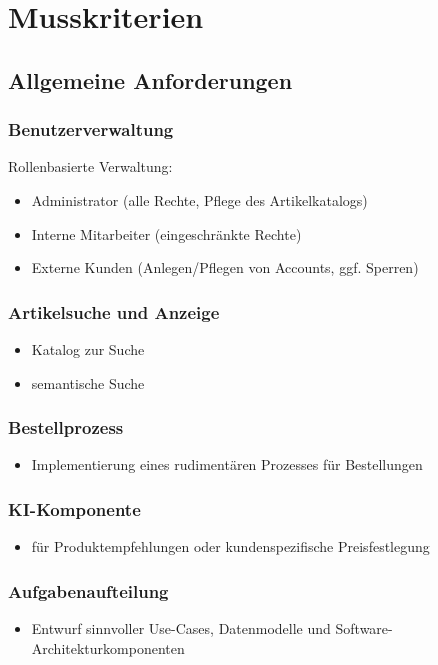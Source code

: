 \documentclass[%
	ngerman,
	12pt,
	a4paper
]{scrbook}
\begin{document}
\section{Musskriterien}
	\subsection{Allgemeine Anforderungen}
		\subsubsection{Benutzerverwaltung}
			Rollenbasierte Verwaltung:
			\begin{itemize}
				\item Administrator (alle Rechte, Pflege des Artikelkatalogs)
				\item Interne Mitarbeiter (eingeschränkte Rechte)
				\item Externe Kunden (Anlegen/Pflegen von Accounts, ggf. Sperren)
			\end{itemize}
		\subsubsection{Artikelsuche und Anzeige}
			\begin{itemize}
				\item Katalog zur Suche
				\item semantische Suche
			\end{itemize}
		\subsubsection{Bestellprozess}
		\begin{itemize}
			\item Implementierung eines rudimentären Prozesses für Bestellungen
		\end{itemize}
		\subsubsection{KI-Komponente}
		\begin{itemize}
			\item für Produktempfehlungen oder kundenspezifische Preisfestlegung
		\end{itemize}
		\subsubsection{Aufgabenaufteilung}
		\begin{itemize}
			\item Entwurf sinnvoller Use-Cases, Datenmodelle und Software-Architekturkomponenten
		\end{itemize}
\end{document}
